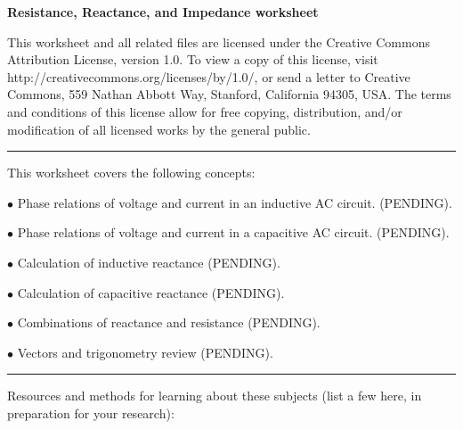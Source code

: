 
\centerline{\bf Resistance, Reactance, and Impedance worksheet} \bigskip 
 
This worksheet and all related files are licensed under the Creative Commons Attribution License, version 1.0.  To view a copy of this license, visit http://creativecommons.org/licenses/by/1.0/, or send a letter to Creative Commons, 559 Nathan Abbott Way, Stanford, California 94305, USA.  The terms and conditions of this license allow for free copying, distribution, and/or modification of all licensed works by the general public.

\bigskip 

\hrule

\vskip 5pt

This worksheet covers the following concepts:

\bigskip

\item {$\bullet$} Phase relations of voltage and current in an inductive AC circuit. (PENDING).
\item {$\bullet$} Phase relations of voltage and current in a capacitive AC circuit. (PENDING).
\item {$\bullet$} Calculation of inductive reactance (PENDING).
\item {$\bullet$} Calculation of capacitive reactance (PENDING).
\item {$\bullet$} Combinations of reactance and resistance (PENDING).
\item {$\bullet$} Vectors and trigonometry review (PENDING).

\bigskip 

\hrule

\vskip 10pt

Resources and methods for learning about these subjects (list a few here, in preparation for your research):




